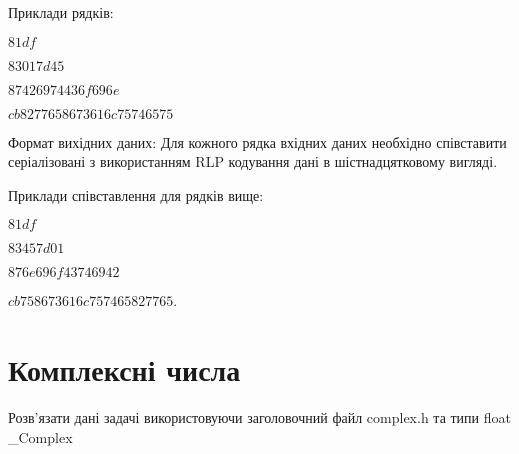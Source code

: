 \documentclass[]{article}
\begin{document}
\begin{enumerate}
Приклади рядків: 

$81df$

$83017d45$

$87426974436f696e$

$cb8277658673616c75746575$

Формат вихідних даних:
Для кожного рядка вхідних даних необхідно співставити серіалізовані з використанням RLP кодування дані в шістнадцятковому вигляді.

Приклади співставлення для рядків вище: 

$81df$

$83457d01$

$876e696f43746942$

$cb758673616c757465827765$.


\end{enumerate}

\section{Комплексні числа}

Розв'язати дані задачі
використовуючи заголовочний файл complex.h та типи float \_Complex
\end{document}
